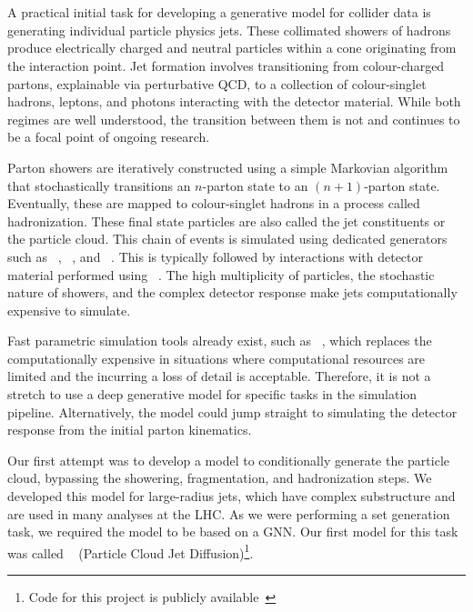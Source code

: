 \section{\pcjedi}

A practical initial task for developing a generative model for collider data is generating individual particle physics jets.
These collimated showers of hadrons produce electrically charged and neutral particles within a cone originating from the interaction point.
Jet formation involves transitioning from colour-charged partons, explainable via perturbative QCD, to a collection of colour-singlet hadrons, leptons, and photons interacting with the detector material.
While both regimes are well understood, the transition between them is not and continues to be a focal point of ongoing research.

Parton showers are iteratively constructed using a simple Markovian algorithm that stochastically transitions an $n$-parton state to an $(n+1)$-parton state.
Eventually, these are mapped to colour-singlet hadrons in a process called hadronization.
These final state particles are also called the jet constituents or the particle cloud.
This chain of events is simulated using dedicated generators such as \pythia~\cite{Pythia8}, \sherpa~\cite{Sherpa}, and \herwig~\cite{Herwig}.
This is typically followed by interactions with detector material performed using \geant~\cite{Geant4}.
The high multiplicity of particles, the stochastic nature of showers, and the complex detector response make jets computationally expensive to simulate.

Fast parametric simulation tools already exist, such as \delphes~\cite{Delphes}, which replaces the computationally expensive \geant in situations where computational resources are limited and the incurring a loss of detail is acceptable.
Therefore, it is not a stretch to use a deep generative model for specific tasks in the simulation pipeline.
Alternatively, the model could jump straight to simulating the detector response from the initial parton kinematics.

Our first attempt was to develop a model to conditionally generate the particle cloud, bypassing the showering, fragmentation, and hadronization steps.
We developed this model for large-radius jets, which have complex substructure and are used in many analyses at the LHC.
As we were performing a set generation task, we required the model to be based on a GNN.
Our first model for this task was called \pcjedi~\cite{PCJedi} (Particle Cloud Jet Diffusion)\footnote{Code for this project is publicly available~\cite{PCJediCode}}.

